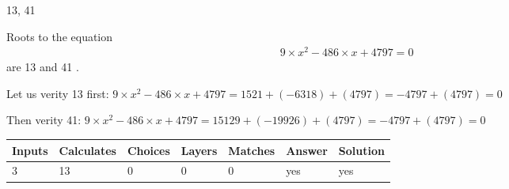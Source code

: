 \documentclass[12pt]{article}
\begin{document}
 
 
\noindent{}
 
 

13,  %
41
 
 
 
\noindent{}
 
 

 
 
 
\noindent{}
 
 

Roots to the equation
\begin{eqnarray*}
9 \times x^2  %
-486
                 \times x    %
+  %
4797 =0
\end{eqnarray*}
are  %
13 and  %
41 .
 
Let us verity  %
13 first:
$  %
9 \times x^2  %
-486
                 \times x    %
+  %
4797
  = %
1521+( %
-6318)+( %
4797)
  = %
-4797+( %
4797)
  = %
0
$
 
Then verity  %
41:
$  %
9 \times x^2  %
-486
                 \times x    %
+  %
4797
  = %
15129+( %
-19926)+( %
4797)
  = %
-4797+( %
4797)
  = %
0
$
 
 
 
\noindent{}
 
 

 
\vspace{0.3in}
   
   
   
   
\noindent\begin{tabular}{|l|l|l|l|l|l|l|}
 \hline
Inputs & Calculates & Choices & Layers & Matches & Answer & Solution \\ \hline
           3  & 
          13  & 
           0
  & 
           0  & 
           0  & 
  yes & 
  yes 
  \\ \hline
 \end{tabular}
   
   
   
   
\noindent{}
   
   
  
\end{document}
